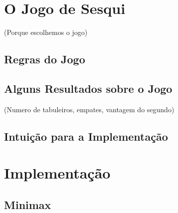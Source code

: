 \documentclass[12pt,a4paper,oneside]{article}
\begin{document}
\lipsum[5]



\section{O Jogo de Sesqui}
\label{sec:sesqui}

(Porque escolhemos o jogo)

\lipsum[1]

\subsection{Regras do Jogo}

\lipsum[1]

\lipsum[2]

\lipsum[3]

\subsection{Alguns Resultados sobre o Jogo}

(Numero de tabuleiros, empates, vantagem do segundo)

\lipsum[1]

\lipsum[2]

\subsection{Intuição para a Implementação}

\lipsum[1]

\lipsum[2]


\section{Implementação}
\label{sec:imp}

\lipsum[1]

\subsection{Minimax}

\lipsum[1]
\end{document}
